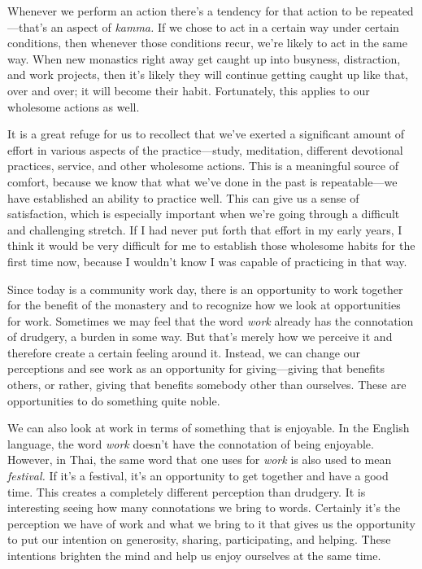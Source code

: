 Whenever we perform an action there's a tendency for that action to be 
repeated---that's an aspect of \emph{kamma.} If we chose to act in a 
certain way under certain conditions, then whenever those conditions 
recur, we're likely to act in the same way. When new monastics right 
away get caught up into busyness, distraction, and work projects, then 
it's likely they will continue getting caught up like that, over and 
over; it will become their habit. Fortunately, this applies to our 
wholesome actions as well.

It is a great refuge for us to recollect that we've exerted a 
significant amount of effort in various aspects of the 
practice---study, meditation, different devotional practices, service, 
and other wholesome actions. This is a meaningful source of comfort, 
because we know that what we've done in the past is repeatable---we 
have established an ability to practice well. This can give us a sense 
of satisfaction, which is especially important when we're going through 
a difficult and challenging stretch. If I had never put forth that 
effort in my early years, I think it would be very difficult for me to 
establish those wholesome habits for the first time now, because I 
wouldn't know I was capable of practicing in that way.


Since today is a community work day, there is an opportunity to work 
together for the benefit of the monastery and to recognize how we look 
at opportunities for work. Sometimes we may feel that the word 
\emph{work} already has the connotation of drudgery, a burden in some 
way. But that's merely how we perceive it and therefore create a 
certain feeling around it. Instead, we can change our perceptions and 
see work as an opportunity for giving---giving that benefits others, or 
rather, giving that benefits somebody other than ourselves. These are 
opportunities to do something quite noble.

We can also look at work in terms of something that is enjoyable. In 
the English language, the word \emph{work} doesn't have the connotation 
of being enjoyable. However, in Thai, the same word that one uses for 
\emph{work} is also used to mean \emph{festival.} If it's a festival, 
it's an opportunity to get together and have a good time. This creates 
a completely different perception than drudgery. It is interesting 
seeing how many connotations we bring to words. Certainly it's the 
perception we have of work and what we bring to it that gives us the 
opportunity to put our intention on generosity, sharing, participating, 
and helping. These intentions brighten the mind and help us enjoy 
ourselves at the same time.

